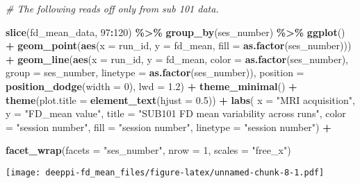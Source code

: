 \documentclass[
]{article}
\newenvironment{Shaded}{\begin{snugshade}}{\end{snugshade}}
\newcommand{\AttributeTok}[1]{\textcolor[rgb]{0.13,0.29,0.53}{#1}}
\newcommand{\CommentTok}[1]{\textcolor[rgb]{0.56,0.35,0.01}{\textit{#1}}}
\newcommand{\DecValTok}[1]{\textcolor[rgb]{0.00,0.00,0.81}{#1}}
\newcommand{\FloatTok}[1]{\textcolor[rgb]{0.00,0.00,0.81}{#1}}
\newcommand{\FunctionTok}[1]{\textcolor[rgb]{0.13,0.29,0.53}{\textbf{#1}}}
\newcommand{\NormalTok}[1]{#1}
\newcommand{\SpecialCharTok}[1]{\textcolor[rgb]{0.81,0.36,0.00}{\textbf{#1}}}
\newcommand{\StringTok}[1]{\textcolor[rgb]{0.31,0.60,0.02}{#1}}
\begin{document}
\begin{Shaded}
\begin{Highlighting}[]
\CommentTok{\# The following reads off only from sub 101 data. }

\FunctionTok{slice}\NormalTok{(fd\_mean\_data, }\DecValTok{97}\SpecialCharTok{:}\DecValTok{120}\NormalTok{) }\SpecialCharTok{\%\textgreater{}\%}
  \FunctionTok{group\_by}\NormalTok{(ses\_number) }\SpecialCharTok{\%\textgreater{}\%}
    \FunctionTok{ggplot}\NormalTok{() }\SpecialCharTok{+} 
    \FunctionTok{geom\_point}\NormalTok{(}\FunctionTok{aes}\NormalTok{(}\AttributeTok{x =}\NormalTok{ run\_id, }\AttributeTok{y =}\NormalTok{ fd\_mean, }\AttributeTok{fill =} \FunctionTok{as.factor}\NormalTok{(ses\_number))) }\SpecialCharTok{+}
    \FunctionTok{geom\_line}\NormalTok{(}\FunctionTok{aes}\NormalTok{(}\AttributeTok{x =}\NormalTok{ run\_id, }\AttributeTok{y =}\NormalTok{ fd\_mean, }\AttributeTok{color =} \FunctionTok{as.factor}\NormalTok{(ses\_number), }
                  \AttributeTok{group =}\NormalTok{ ses\_number, }\AttributeTok{linetype =} \FunctionTok{as.factor}\NormalTok{(ses\_number)), }
              \AttributeTok{position =} \FunctionTok{position\_dodge}\NormalTok{(}\AttributeTok{width =} \DecValTok{0}\NormalTok{), }\AttributeTok{lwd =} \FloatTok{1.2}\NormalTok{) }\SpecialCharTok{+}
    \FunctionTok{theme\_minimal}\NormalTok{() }\SpecialCharTok{+}
    \FunctionTok{theme}\NormalTok{(}\AttributeTok{plot.title =} \FunctionTok{element\_text}\NormalTok{(}\AttributeTok{hjust =} \FloatTok{0.5}\NormalTok{)) }\SpecialCharTok{+}
    \FunctionTok{labs}\NormalTok{(}
    \AttributeTok{x =} \StringTok{"MRI acquisition"}\NormalTok{, }
    \AttributeTok{y =} \StringTok{"FD\_mean value"}\NormalTok{, }
    \AttributeTok{title =} \StringTok{"SUB101 FD mean variability across runs"}\NormalTok{,}
    \AttributeTok{color =} \StringTok{"session number"}\NormalTok{,}
    \AttributeTok{fill =} \StringTok{"session number"}\NormalTok{,}
    \AttributeTok{linetype =} \StringTok{"session number"}\NormalTok{) }\SpecialCharTok{+} 

    \FunctionTok{facet\_wrap}\NormalTok{(}\AttributeTok{facets =} \StringTok{"ses\_number"}\NormalTok{, }\AttributeTok{nrow =} \DecValTok{1}\NormalTok{, }\AttributeTok{scales =} \StringTok{"free\_x"}\NormalTok{) }
\end{Highlighting}
\end{Shaded}

\texttt{[image: deeppi-fd\_mean\_files/figure-latex/unnamed-chunk-8-1.pdf]}
\end{document}
